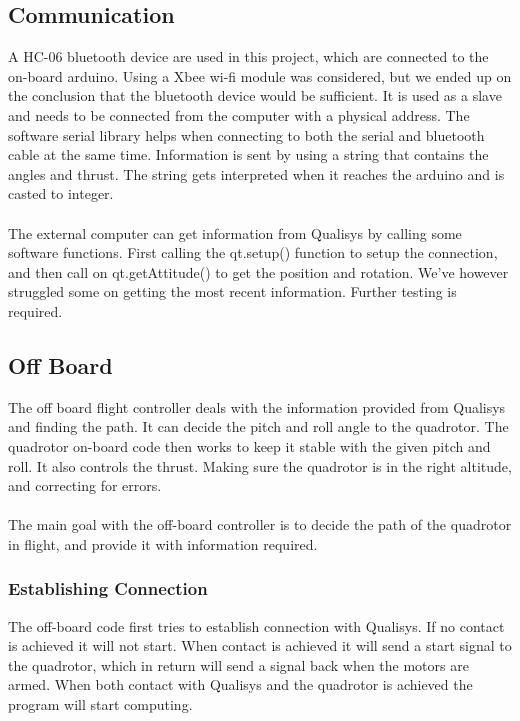 \subsection{Communication}
A HC-06 bluetooth device are used in this project, which are connected to the on-board arduino. Using a Xbee wi-fi module was considered, but we ended up on the conclusion that the bluetooth device would be sufficient. It is used as a slave and needs to be connected from the computer with a physical address. The software serial library helps when connecting to both the serial and bluetooth cable at the same time. Information is sent by using a string that contains the angles and thrust. The string gets interpreted when it reaches the arduino and is casted to integer.
\\\\
The external computer can get information from Qualisys by calling some software functions. First calling the qt.setup() function to setup the connection, and then call on qt.getAttitude() to get the position and rotation. We've however struggled some on getting the most recent information. Further testing is required. 

\subsection{Off Board}
The off board flight controller deals with the information provided from Qualisys and finding the path. It can decide the pitch and roll angle to the quadrotor. The quadrotor on-board code then works to keep it stable with the given pitch and roll. It also controls the thrust. Making sure the quadrotor is in the right altitude, and correcting for errors. 
\\\\
The main goal with the off-board controller is to decide the path of the quadrotor in flight, and provide it with information required. 
\subsubsection{Establishing Connection}
The off-board code first tries to establish connection with Qualisys. If no contact is achieved it will not start. When contact is achieved it will send a start signal to the quadrotor, which in return will send a signal back when the motors are armed. When both contact with Qualisys and the quadrotor is achieved the program will start computing. \\
